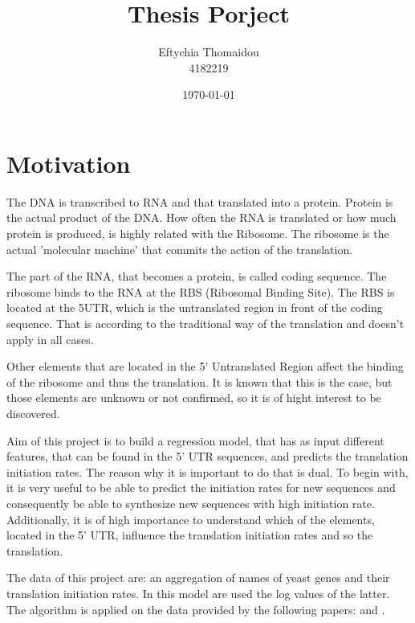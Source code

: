 \documentclass{article}
\author{Eftychia Thomaidou \\
\small 4182219}
\title{Thesis Porject}
\date{\today}
\begin{document}

\maketitle



\section{Motivation} 


The DNA is transcribed to RNA and that translated into a protein. Protein 
is the actual product of the DNA. How often the RNA is translated or how 
much protein is produced, is highly related with the Ribosome. The ribosome 
is the actual 'molecular machine' that commits the action of the translation.


The part of the RNA, that becomes a protein, is called coding sequence. The ribosome binds to the RNA at the RBS (Ribosomal Binding Site). The RBS is located at the 5UTR, which is the untranslated region in front of the coding sequence. That is according to  the traditional way of the translation and doesn't apply in all cases.

Other elements that are located in the 5' Untranslated Region affect the binding of the ribosome and thus the translation. It is known that this is the case, but those elements are unknown or not confirmed, so it is of hight interest to be discovered. 

Aim of this project is to build a regression model, that has as input different features, that can be found in the 5' UTR sequences, and predicts the translation initiation rates. The reason why it is important to do that is dual. To begin with, it is very useful to be able to predict the initiation rates for new sequences and consequently be able to synthesize new sequences with high initiation rate. Additionally, it is of high importance to understand which of the elements, located in the 5' UTR, influence the translation initiation rates and so the translation.

The data of this project are: an aggregation of names of yeast genes and their translation initiation rates. In this model are used the log values of the latter. The algorithm is applied on the data provided by the following papers: \cite{Gritsenko2014} and \cite{ciandrini2013ribosome}.

\end{document}
